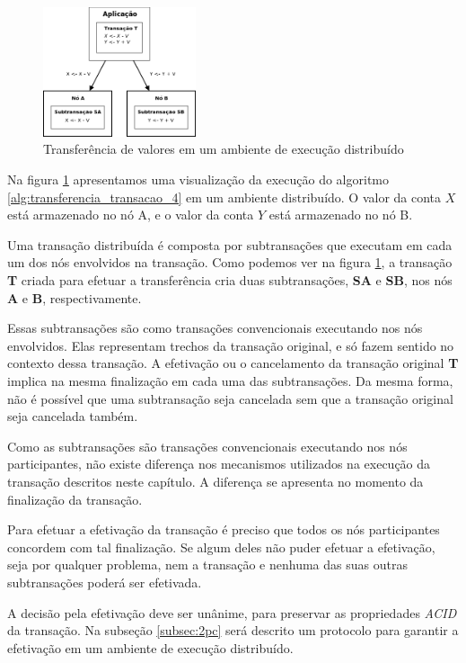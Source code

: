 \documentclass[11pt,twoside,a4paper]{book}
\begin{document}
\begin{figure}
  \centering
  \includegraphics[width=0.4\textwidth]{transferencia_valores_distribuido} 
  \caption{Transferência de valores em um ambiente de execução distribuído}
  \label{fig:transferencia_valores_distribuido} 
\end{figure}

Na figura \ref{fig:transferencia_valores_distribuido} apresentamos uma visualização da execução do algoritmo \ref{alg:transferencia_transacao_4} em um ambiente distribuído. O valor da conta $X$ está armazenado no nó A, e o valor da conta $Y$ está armazenado no nó B.

Uma transação distribuída é composta por subtransações que executam em cada um dos nós envolvidos na transação. Como podemos ver na figura \ref{fig:transferencia_valores_distribuido}, a transação \textbf{T} criada para efetuar a transferência cria duas subtransações, \textbf{SA} e \textbf{SB}, nos nós \textbf{A} e \textbf{B}, respectivamente.

Essas subtransações são como transações convencionais executando nos nós envolvidos. Elas representam trechos da transação original, e só fazem sentido no contexto dessa transação. A efetivação ou o cancelamento da transação original \textbf{T} implica na mesma finalização em cada uma das subtransações. Da mesma forma, não é possível que uma subtransação seja cancelada sem que a transação original seja cancelada também.

Como as subtransações são transações convencionais executando nos nós participantes, não existe diferença nos mecanismos utilizados na execução da transação descritos neste capítulo. A diferença se apresenta no momento da finalização da transação.

Para efetuar a efetivação da transação é preciso que todos os nós participantes concordem com tal finalização. Se algum deles não puder efetuar a efetivação, seja por qualquer problema,  nem a transação e nenhuma das suas outras subtransações poderá ser efetivada. 

A decisão pela efetivação deve ser unânime, para preservar as propriedades \emph{ACID} da transação. Na subseção \ref{subsec:2pc} será descrito um protocolo para garantir a efetivação em um ambiente de execução distribuído.
\end{document}

